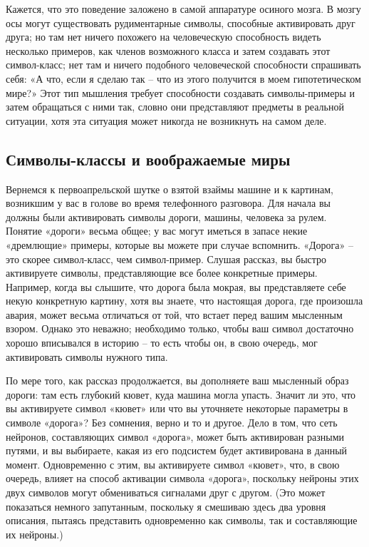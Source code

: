 \documentclass[../main.tex]{subfiles}
\begin{document}
Кажется, что это поведение заложено в самой аппаратуре осиного мозга. В мозгу осы могут существовать рудиментарные символы, способные активировать друг друга; но там нет ничего похожего на человеческую способность видеть несколько примеров, как членов возможного класса и затем создавать этот символ-класс; нет там и ничего подобного человеческой способности спрашивать себя: «А что, если я сделаю так \--- что из этого получится в моем гипотетическом мире?» Этот тип мышления требует способности создавать символы-примеры и затем обращаться с ними так, словно они представляют предметы в реальной ситуации, хотя эта ситуация может никогда не возникнуть на самом деле.


\subsection{Символы-классы и воображаемые миры}

Вернемся к первоапрельской шутке о взятой взаймы машине и к картинам, возникшим у вас в голове во время телефонного разговора. Для начала вы должны были активировать символы дороги, машины, человека за рулем. Понятие «дороги» весьма общее; у вас могут иметься в запасе некие «дремлющие» примеры, которые вы можете при случае вспомнить. «Дорога» \--- это скорее символ-класс, чем символ-пример. Слушая рассказ, вы быстро активируете символы, представляющие все более конкретные примеры. Например, когда вы слышите, что дорога была мокрая, вы представляете себе некую конкретную картину, хотя вы знаете, что настоящая дорога, где произошла авария, может весьма отличаться от той, что встает перед вашим мысленным взором. Однако это неважно; необходимо только, чтобы ваш символ достаточно хорошо вписывался в историю \--- то есть чтобы он, в свою очередь, мог активировать символы нужного типа.

По мере того, как рассказ продолжается, вы дополняете ваш мысленный образ дороги: там есть глубокий кювет, куда машина могла упасть. Значит ли это, что вы активируете символ «кювет» или что вы уточняете некоторые параметры в символе «дорога»? Без сомнения, верно и то и другое. Дело в том, что сеть нейронов, составляющих символ «дорога», может быть активирован разными путями, и вы выбираете, какая из его подсистем будет активирована в данный момент. Одновременно с этим, вы активируете символ «кювет», что, в свою очередь, влияет на способ активации символа «дорога», поскольку нейроны этих двух символов могут обмениваться сигналами друг с другом. (Это может показаться немного запутанным, поскольку я смешиваю здесь два уровня описания, пытаясь представить одновременно как символы, так и составляющие их нейроны.)
\end{document}
